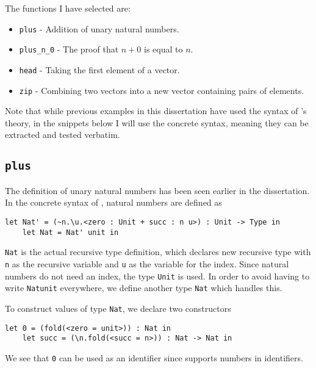\documentclass[12pt,a4paper,twoside]{report}
\begin{document}
The functions I have selected are:
\begin{itemize}
    \item \texttt{plus} - Addition of unary natural numbers.
    \item \texttt{plus\_n\_0} - The proof that \(n + 0\) is equal to \(n\).
    \item \texttt{head} - Taking the first element of a vector.
    \item \texttt{zip} - Combining two vectors into a new vector containing pairs of elements.
\end{itemize}

Note that while previous examples in this dissertation have used the syntax of \pimu{}'s theory, in the snippets below I will use the concrete syntax, meaning they can be extracted and tested verbatim.

\subsection{\texttt{plus}}

The definition of unary natural numbers has been seen earlier in the dissertation.
In the concrete syntax of \pimu{}, natural numbers are defined as
\begin{lstlisting}[gobble=4]
    let Nat' = (~n.\u.<zero : Unit + succ : n u>) : Unit -> Type in
    let Nat = Nat' unit in
\end{lstlisting}
\texttt{Nat\textquotesingle} is the actual recursive type definition, which declares new recursive type with \texttt{n} as the recursive variable and \texttt{u} as the variable for the index.
Since natural numbers do not need an index, the type \texttt{Unit} is used.
In order to avoid having to write \texttt{Nat\textquotesingle unit} everywhere, we define another type \texttt{Nat} which handles this.

To construct values of type \texttt{Nat}, we declare two constructors
\begin{lstlisting}[gobble=4]
    let 0 = (fold(<zero = unit>)) : Nat in
    let succ = (\n.fold(<succ = n>)) : Nat -> Nat in
\end{lstlisting}
We see that \texttt{0} can be used as an identifier since \pimu{} supports numbers in identifiers.
\end{document}

